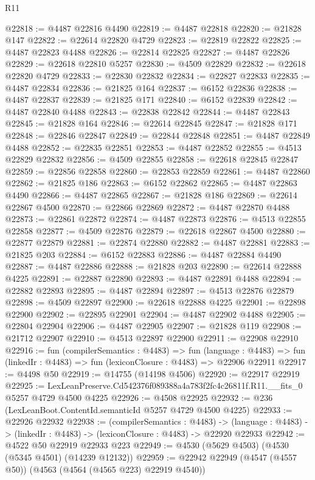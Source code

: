 \begin{lexlean}{R11}
\begin{coremodule}
@22818 := @4487 @22816 @4490
@22819 := @4487 @22818
@22820 := @21828 @147
@22822 := @22614 @22820 @4729
@22823 := @22819 @22822
@22825 := @4487 @22823 @4488
@22826 := @22814 @22825
@22827 := @4487 @22826
@22829 := @22618 @22810 @5257
@22830 := @4509 @22829
@22832 := @22618 @22820 @4729
@22833 := @22830 @22832
@22834 := @22827 @22833
@22835 := @4487 @22834
@22836 := @21825 @164
@22837 := @6152 @22836
@22838 := @4487 @22837
@22839 := @21825 @171
@22840 := @6152 @22839
@22842 := @4487 @22840 @4488
@22843 := @22838 @22842
@22844 := @4487 @22843
@22845 := @21828 @164
@22846 := @22614 @22845
@22847 := @21828 @171
@22848 := @22846 @22847
@22849 := @22844 @22848
@22851 := @4487 @22849 @4488
@22852 := @22835 @22851
@22853 := @4487 @22852
@22855 := @4513 @22829 @22832
@22856 := @4509 @22855
@22858 := @22618 @22845 @22847
@22859 := @22856 @22858
@22860 := @22853 @22859
@22861 := @4487 @22860
@22862 := @21825 @186
@22863 := @6152 @22862
@22865 := @4487 @22863 @4490
@22866 := @4487 @22865
@22867 := @21828 @186
@22869 := @22614 @22867 @4500
@22870 := @22866 @22869
@22872 := @4487 @22870 @4488
@22873 := @22861 @22872
@22874 := @4487 @22873
@22876 := @4513 @22855 @22858
@22877 := @4509 @22876
@22879 := @22618 @22867 @4500
@22880 := @22877 @22879
@22881 := @22874 @22880
@22882 := @4487 @22881
@22883 := @21825 @203
@22884 := @6152 @22883
@22886 := @4487 @22884 @4490
@22887 := @4487 @22886
@22888 := @21828 @203
@22890 := @22614 @22888 @4225
@22891 := @22887 @22890
@22893 := @4487 @22891 @4488
@22894 := @22882 @22893
@22895 := @4487 @22894
@22897 := @4513 @22876 @22879
@22898 := @4509 @22897
@22900 := @22618 @22888 @4225
@22901 := @22898 @22900
@22902 := @22895 @22901
@22904 := @4487 @22902 @4488
@22905 := @22804 @22904
@22906 := @4487 @22905
@22907 := @21828 @119
@22908 := @21712 @22907
@22910 := @4513 @22897 @22900
@22911 := @22908 @22910
@22916 := fun (compilerSemantics : @4483) =>
  fun (language : @4483) => fun (linkedIr : @4483) => fun (lexiconClosure : @4483) => @22906 @22911
@22917 := @4498 @50
@22919 := @14755 (@14198 @4506)
@22920 := @22917 @22919
@22925 := LexLeanPreserve.Cd542376f089388a4a783f2fc4c26811f.R11.__fits_0 @5257 @4729 @4500 @4225
@22926 := @4508 @22925
@22932 := @236 (LexLeanBoot.ContentId.semanticId @5257 @4729 @4500 @4225)
@22933 := @22926 @22932
@22938 := (compilerSemantics : @4483) ->
  (language : @4483) -> (linkedIr : @4483) -> (lexiconClosure : @4483) -> @22920 @22933
@22942 := @4522 @50 @22919 @22933 @223
@22949 := @4530 (@5629 @4503) (@4530 (@5345 @4501) (@14239 @12132))
@22959 := @22942 @22949 (@4547 (@4557 @50)) (@4563 (@4564 (@4565 @223) @22919 @4540))

\end{coremodule}
\end{lexlean}
